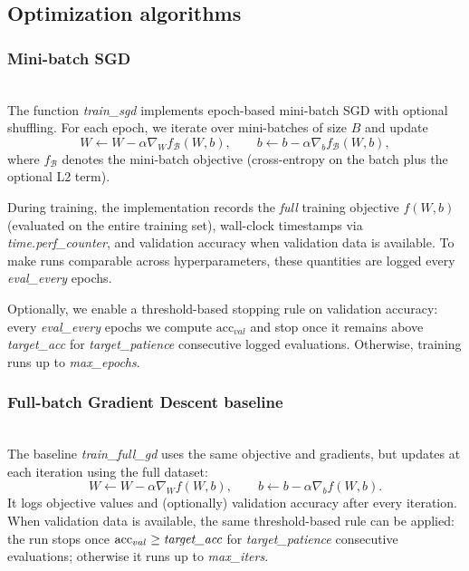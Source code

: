\subsection{Optimization algorithms}

\subsubsection{Mini-batch SGD}\;\\
The function \emph{train\_sgd} implements epoch-based mini-batch SGD with optional shuffling.
For each epoch, we iterate over mini-batches of size $B$ and update
\[
W \leftarrow W - \alpha \nabla_W f_{\mathcal{B}}(W,b),\qquad
b \leftarrow b - \alpha \nabla_b f_{\mathcal{B}}(W,b),
\]
where $f_{\mathcal{B}}$ denotes the mini-batch objective (cross-entropy on the batch plus the optional L2 term).

During training, the implementation records the \emph{full} training objective $f(W,b)$ (evaluated on the entire training set), wall-clock timestamps via \emph{time.perf\_counter}, and validation accuracy when validation data is available.
To make runs comparable across hyperparameters, these quantities are logged every \emph{eval\_every} epochs.

Optionally, we enable a threshold-based stopping rule on validation accuracy: every \emph{eval\_every} epochs we compute $\mathrm{acc}_{val}$ and stop once it remains above \emph{target\_acc} for \emph{target\_patience} consecutive logged evaluations. Otherwise, training runs up to \emph{max\_epochs}.

\subsubsection{Full-batch Gradient Descent baseline}\;\\
The baseline \emph{train\_full\_gd} uses the same objective and gradients, but updates at each iteration using the full dataset:
\[
W \leftarrow W - \alpha \nabla_W f(W,b),\qquad
b \leftarrow b - \alpha \nabla_b f(W,b).
\]
It logs objective values and (optionally) validation accuracy after every iteration. When validation data is available, the same threshold-based rule can be applied: the run stops once $\mathrm{acc}_{val} \ge \emph{target\_acc}$ for \emph{target\_patience} consecutive evaluations; otherwise it runs up to \emph{max\_iters}.

